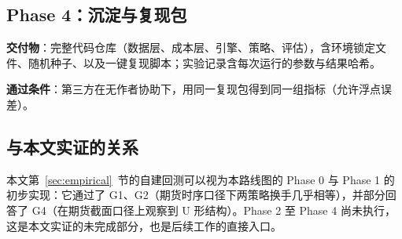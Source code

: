 \subsection{Phase 4：沉淀与复现包}

\textbf{交付物}：完整代码仓库（数据层、成本层、引擎、策略、评估），含环境锁定文件、随机种子、以及一键复现脚本；实验记录含每次运行的参数与结果哈希。

\textbf{通过条件}：第三方在无作者协助下，用同一复现包得到同一组指标（允许浮点误差）。

\subsection{与本文实证的关系}

本文第~\ref{sec:empirical}~节的自建回测可以视为本路线图的 Phase 0 与 Phase 1 的初步实现：它通过了 G1、G2（期货时序口径下两策略换手几乎相等），并部分回答了 G4（在期货截面口径上观察到 U 形结构）。Phase 2 至 Phase 4 尚未执行，这是本文实证的未完成部分，也是后续工作的直接入口。
